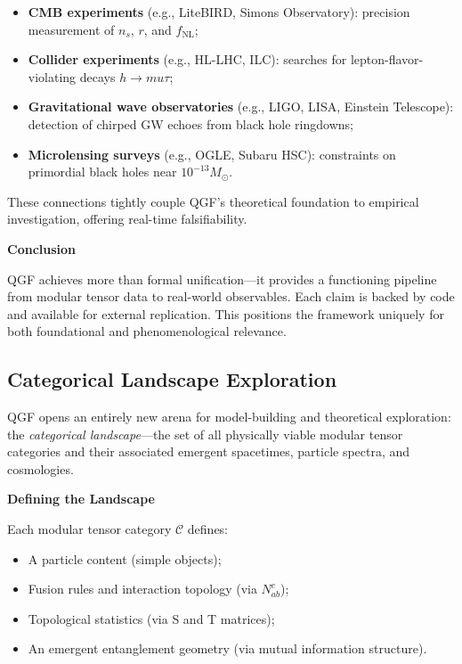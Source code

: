 \documentclass[11pt]{article}
\def\mu{mu}
\begin{document}
\begin{itemize}
  \item \textbf{CMB experiments} (e.g., LiteBIRD, Simons Observatory): precision measurement of \( n_s \), \( r \), and \( f_{\text{NL}} \);
  \item \textbf{Collider experiments} (e.g., HL-LHC, ILC): searches for lepton-flavor-violating decays \( h \rightarrow \mu\tau \);
  \item \textbf{Gravitational wave observatories} (e.g., LIGO, LISA, Einstein Telescope): detection of chirped GW echoes from black hole ringdowns;
  \item \textbf{Microlensing surveys} (e.g., OGLE, Subaru HSC): constraints on primordial black holes near \( 10^{-13} M_\odot \).
\end{itemize}

These connections tightly couple QGF’s theoretical foundation to empirical investigation, offering real-time falsifiability.

\vspace{0.5em}
\noindent\textbf{Conclusion}

QGF achieves more than formal unification—it provides a functioning pipeline from modular tensor data to real-world observables. Each claim is backed by code and available for external replication. This positions the framework uniquely for both foundational and phenomenological relevance.



\subsection{Categorical Landscape Exploration}

QGF opens an entirely new arena for model-building and theoretical exploration: the \emph{categorical landscape}—the set of all physically viable modular tensor categories and their associated emergent spacetimes, particle spectra, and cosmologies.

\vspace{0.5em}
\noindent\textbf{Defining the Landscape}

Each modular tensor category \( \mathcal{C} \) defines:
\begin{itemize}
  \item A particle content (simple objects);
  \item Fusion rules and interaction topology (via \( N_{ab}^c \));
  \item Topological statistics (via S and T matrices);
  \item An emergent entanglement geometry (via mutual information structure).
\end{itemize}
\end{document}
